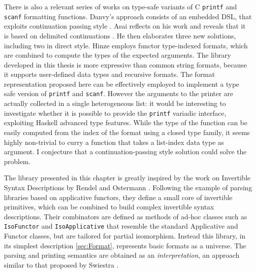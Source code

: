 \documentclass[../Thesis.tex]{subfiles}
\begin{document}
There is also a relevant series of works on type-safe variants of 
C \texttt{printf} and \texttt{scanf} formatting functions.
Danvy's approach consists of an embedded DSL, that exploits continuation
passing style \cite{Danvy}.
Asai reflects on his work and reveals that it is based on delimited continuations \cite{Asai}. He then elaborates three new solutions, including
two in direct style.
Hinze employs functor type-indexed formats, which are combined to
compute the types of the expected arguments.
The library developed in this thesis is more expressive than 
common string formats, because it supports user-defined data types and
recursive formats. 
The format representation proposed here can be effectively employed to implement a type safe version of \texttt{printf} and \texttt{scanf}.
However the arguments to the printer are actually collected in a single heterogeneous list: it would be interesting to investigate whether it is possible
to provide the \texttt{printf} variadic interface, exploiting
Haskell advanced type features. While the type of the function
can be easily computed from the index of the format using a closed type family, it seems highly non-trivial to curry a function that takes a list-index
data type as argument. I conjecture that a continuation-passing style solution
could solve the problem.

The library presented in this chapter is greatly inspired by the
work on Invertible Syntax Descriptions by Rendel and Ostermann \cite{Rendel10ISD}.
Following the example of parsing libraries based on applicative functors, 
they define a small core of invertible primitives,
which can be combined to build complex invertible syntax descriptions.
Their combinators are defined as methods of ad-hoc classes 
such as \texttt{IsoFunctor} and \texttt{IsoApplicative} that
resemble the standard Applicative and Functor classes, but
are tailored for partial isomorphism.
Instead this library, in its simplest description \ref{sec:Format}, 
represents basic formats as a universe.
The parsing and printing semantics are obtained as an \emph{interpretation}, an approach similar to that proposed by Swiestra \cite{PowerOfPi}.
\end{document}
